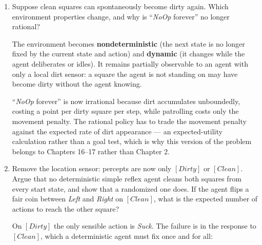 \begin{enumerate}
\begin{sol}
\begin{itemize}[leftmargin=1.5em]
\item If it \emph{moves} on \textit{Clean}, then once both squares are clean it moves forever,
paying the $M_2$ penalty forever --- irrational.
\item If it does \textit{NoOp} on \textit{Clean}, then a start in a clean A with dirt in B
means it never crosses to B, and B is never cleaned --- also irrational.
\item Randomizing between these two only mixes the two failures; the movement penalty is still
paid indefinitely with positive probability per step.
\end{itemize}
So no mapping from the current percept alone is rational under $M_2$.

The missing capability is \textbf{internal state}: memory that both squares have been observed
clean. That upgrades the design to a \textbf{model-based reflex agent}, which needs a transition
model (``sucking cleans the current square; clean squares stay clean; \textit{Left}/\textit{Right}
change my location'') and a sensor model. With that state, the rational policy is: clean what
you see, sweep once to the other square, then \textit{NoOp} forever.
\end{sol}

\item Suppose clean squares can spontaneously become dirty again. Which environment properties
change, and why is ``\textit{NoOp} forever'' no longer rational?
\ansspace{3.5cm}
\begin{sol}
The environment becomes \textbf{nondeterministic} (the next state is no longer fixed by the
current state and action) and \textbf{dynamic} (it changes while the agent deliberates or
idles). It remains partially observable to an agent with only a local dirt sensor: a square the
agent is not standing on may have become dirty without the agent knowing.

``\textit{NoOp} forever'' is now irrational because dirt accumulates unboundedly, costing a
point per dirty square per step, while patrolling costs only the movement penalty. The rational
policy has to trade the movement penalty against the expected rate of dirt appearance --- an
expected-utility calculation rather than a goal test, which is why this version of the problem
belongs to Chapters 16--17 rather than Chapter 2.
\end{sol}

\item Remove the location sensor: percepts are now only $[\textit{Dirty}]$ or
$[\textit{Clean}]$. Argue that no deterministic simple reflex agent cleans both squares from
every start state, and show that a randomized one does. If the agent flips a fair coin between
\textit{Left} and \textit{Right} on $[\textit{Clean}]$, what is the expected number of actions
to reach the other square?
\ansspace{4.0cm}
\begin{sol}
On $[\textit{Dirty}]$ the only sensible action is \textit{Suck}. The failure is in the response
to $[\textit{Clean}]$, which a deterministic agent must fix once and for all:


\end{sol}
\end{enumerate}
